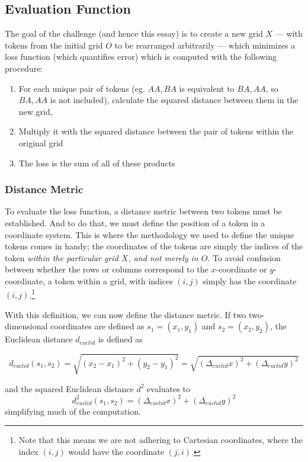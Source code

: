 \subsection{Evaluation Function}%
\label{sub:evaluation_function}

The goal of the challenge (and hence this essay) is to create a new grid $X$ --- with tokens from the initial grid $O$ to be rearranged arbitrarily --- which minimizes a loss function (which quantifies error) which is computed with the following procedure:
\begin{enumerate}
    \item For each unique pair of tokens (eg. $AA,BA$ is equivalent to $BA,AA$, so $BA,AA$ is not included), calculate the squared distance between them in the new grid,
\item Multiply it with the squared distance between the pair of tokens within the original grid
\item The loss is the sum of all of these products
\end{enumerate}

\subsubsection{Distance Metric}%
\label{ssub:distance_metric}
To evaluate the loss function, a distance metric between two tokens must be established. And to do that, we must define the position of a token in a coordinate system. This is where the methodology we used to define the unique tokens comes in handy; the coordinates of the tokens are simply the indices of the token \emph{within the particular grid $X$, and not merely in $O$}. To avoid confusion between whether the rows or columns correspond to the $x$-coordinate or $y$-coordinate, a token within a grid, with indices $(i,j)$ simply has the coordinate $(i,j)$.\footnote{Note that this means we are not adhering to Cartesian coordinates, where the index $(i,j)$ would have the coordinate $(j,i)$.}

With this definition, we can now define the distance metric. If two two-dimensional coordinates are defined as $s_1=(x_1,y_1)$ and $s_2=(x_2,y_2)$, the Euclidean distance $d_{euclid}$ is defined as

\begin{equation}
    \label{eq:euclid}
    d_{euclid}(s_1,s_2)=\sqrt{(x_2-x_1)^2+(y_2-y_1)^2}=\sqrt{(\Delta_{euclid} x)^2+(\Delta_{euclid} y)^2}
\end{equation}

and the squared Euclidean distance $d^2$ evaluates to
\begin{equation}
    d_{euclid}^2(s_1,s_2)=(\Delta_{euclid} x)^2+(\Delta_{euclid} y)^2
    \label{eq:squaredEuclid}
\end{equation}
simplifying much of the computation.

